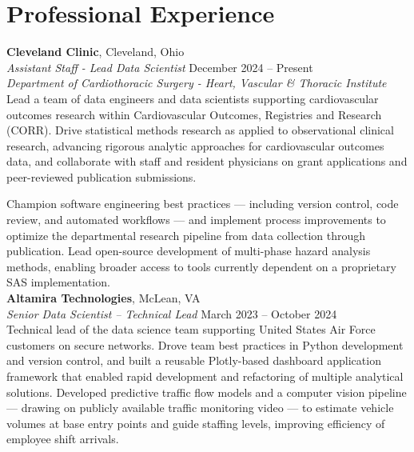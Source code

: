 \documentclass[letterpaper,11pt]{nih}
\begin{document}
\section*{Professional Experience}

\textbf{Cleveland Clinic}, Cleveland, Ohio\\
{\em Assistant Staff - Lead Data Scientist} \hfill {December 2024 -- Present}\\
{\em Department of Cardiothoracic Surgery - Heart, Vascular \& Thoracic Institute}\\

Lead a team of data engineers and data scientists supporting cardiovascular outcomes research within Cardiovascular Outcomes, Registries and Research (CORR). Drive statistical methods research as applied to observational clinical research, advancing rigorous analytic approaches for cardiovascular outcomes data, and collaborate with staff and resident physicians on grant applications and peer-reviewed publication submissions.

Champion software engineering best practices — including version control, code review, and automated workflows — and implement process improvements to optimize the departmental research pipeline from data collection through publication. Lead open-source development of multi-phase hazard analysis methods, enabling broader access to tools currently dependent on a proprietary SAS implementation.\\


\textbf{Altamira Technologies}, McLean, VA \\
{\em Senior Data Scientist -- Technical Lead} \hfill {March 2023 -- October 2024}\\

Technical lead of the data science team supporting United States Air Force customers on secure networks. Drove team best practices in Python development and version control, and built a reusable Plotly-based dashboard application framework that enabled rapid development and refactoring of multiple analytical solutions. Developed predictive traffic flow models and a computer vision pipeline — drawing on publicly available traffic monitoring video — to estimate vehicle volumes at base entry points and guide staffing levels, improving efficiency of employee shift arrivals.\\
\end{document}
